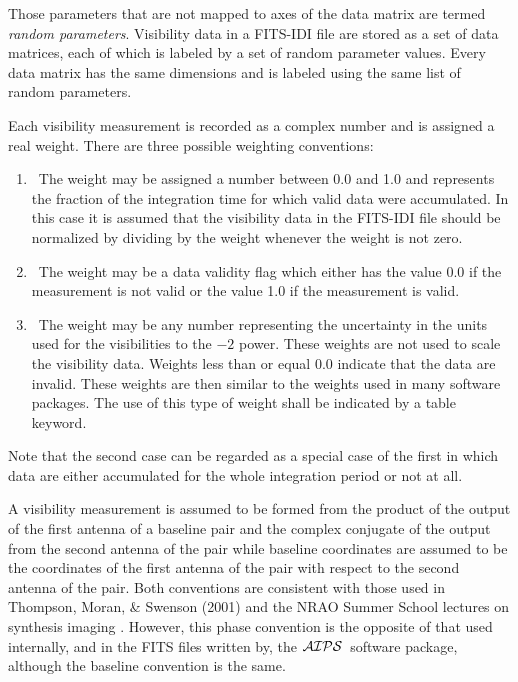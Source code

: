 \documentclass[twoside]{article}
\newcommand{\Hi}[1]{\textcolor{hicol}{#1}}
\newcommand{\Me}[1]{\textcolor{mecol}{#1}}
\newcommand{\mecol}{\color{mecol}}
\newcommand{\hblack}{\color{black}}
\newcommand{\AIPS}{{$\cal AIPS\/$}}
\begin{document}
Those parameters that are not mapped to axes of the data matrix are
termed {\it random parameters}.  Visibility data in a FITS-IDI file
are stored as a set of data matrices, each of which is labeled by a
set of random parameter values.  Every data matrix has the same
dimensions and is labeled using the same list of random parameters.

Each visibility measurement is recorded as a complex number and is
assigned a real weight.  There are \Me{three} possible weighting
conventions:
\begin{enumerate}
\item{\ The weight may be assigned a number between 0.0 and 1.0 and
  represents the fraction of the integration time for which valid data
  were accumulated.  In this case it is assumed that the visibility
  data in the FITS-IDI file should be normalized by dividing by the
  weight whenever the weight is not zero.}
\item{\ The weight may be a data validity flag which either has the
  value 0.0 if the measurement is not valid or the value 1.0 if the
  measurement is valid.}
\mecol
\item{\ The weight may be any number representing the uncertainty in
  the units used for the visibilities to the $-2$ power.  These
  weights are not used to scale the visibility data.  Weights less
  than or equal 0.0 indicate that the data are invalid.  These weights
  are then similar to the weights used in many software packages.  The
  use of this type of weight shall be indicated by a table keyword.}
\hblack
\end{enumerate}
Note that the second case can be regarded as a special case of the
first in which data are either accumulated for the whole integration
period or not at all.

A visibility measurement is assumed to be formed from the product of
the output of the first antenna of a baseline pair and the complex
conjugate of the output from the second antenna of the pair while
baseline coordinates are assumed to be the coordinates of the first
antenna of the pair with respect to the second antenna of the pair.
Both conventions are consistent with those used in Thompson, Moran, \&
Swenson (2001) \cite{TMS01} and the NRAO Summer School lectures on
synthesis imaging \Hi{\cite{SS99}.  However, this phase convention is
the opposite of that used internally, and in the FITS files written
by, the \AIPS\ software package,} although the baseline convention is
the same.
\end{document}

